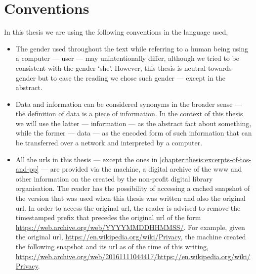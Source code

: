\section{Conventions}
    \label{section:thesis:conventions}
In this thesis we are using the following conventions in the language used,
\begin{itemize}
    \item The gender used throughout the text while referring to a human being using 
    a computer --- user --- may unintentionally differ, although we tried to be 
    consistent with the gender `she'. However, this thesis is neutral towards gender 
    but to ease the reading we chose such gender --- except in the abstract.

    \item Data and information can be considered synonyms in the broader sense --- 
    the definition of data is a piece of information. In the context of this thesis 
    we will use the latter --- information --- as the abstract fact about something, 
    while the former --- data --- as the encoded form of such information that can 
    be transferred over a network and interpreted by a computer.
    
    \item All the \acp{url} in this thesis --- except the ones in \cref{chapter:thesis:excerpts-of-tos-and-pp} ---
    are provided via the \Wayback machine, a digital archive of the \ac{www} and 
    other information on the \Internet created by the \InternetArchive non-profit 
    digital library organisation. The reader has the possibility of accessing a cached 
    snapshot of the version that was used when this thesis was written and also 
    the original \ac{url}. In order to access the original \ac{url}, the reader 
    is advised to remove the timestamped prefix that precedes the original \ac{url} 
    of the form \url{https://web.archive.org/web/YYYYMMDDHHMMSS/}. For example, 
    given the original \ac{url}, \url{https://en.wikipedia.org/wiki/Privacy}, the 
    \Wayback machine created the following snapshot and its \ac{url} as of the time 
    of this writing, \url{https://web.archive.org/web/20161111044417/https://en.wikipedia.org/wiki/Privacy}.
\end{itemize}
